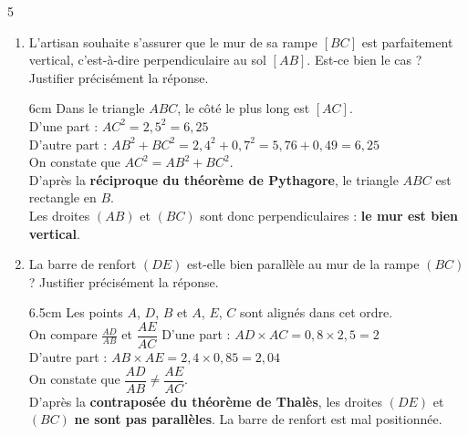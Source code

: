 \documentclass[a4paper]{book}
\begin{document}
{\begin{exerciceNote}{5}
\begin{minipage}{0.49\linewidth}
\begin{center}
            \end{center}
        \end{minipage}      
        
        \medskip
    
        \begin{enumerate}
            \item L'artisan souhaite s'assurer que le mur de sa rampe $[BC]$ est parfaitement vertical, c'est-à-dire perpendiculaire au sol $[AB]$. Est-ce bien le cas ? Justifier précisément la réponse.
            
            \begin{ZoneReponse}{6cm}
            \color{blue}
            Dans le triangle $ABC$, le côté le plus long est $[AC]$. \\
            D'une part : $AC^2 = 2{,}5^2 = 6{,}25$ \\
            D'autre part : $AB^2 + BC^2 = 2{,}4^2 + 0{,}7^2 = 5{,}76 + 0{,}49 = 6{,}25$ \\
            On constate que $AC^2 = AB^2 + BC^2$. \\
            D'après la \textbf{réciproque du théorème de Pythagore}, le triangle $ABC$ est rectangle en $B$. \\
            Les droites $(AB)$ et $(BC)$ sont donc perpendiculaires : \textbf{le mur est bien vertical}.
            \end{ZoneReponse}
            
            \item La barre de renfort $(DE)$ est-elle bien parallèle au mur de la rampe $(BC)$ ? Justifier précisément la réponse.
            
            \begin{ZoneReponse}{6.5cm}
            \color{blue}
            Les points $A$, $D$, $B$ et $A$, $E$, $C$ sont alignés dans cet ordre. \\
            On compare $\frac{AD}{AB}$ et $\dfrac{AE}{AC}$
            D'une part : ${AD}\times{AC} = 0,8\times2,5 = 2$ \\
            D'autre part : ${AB}\times {AE} = 2,4\times 0,85 = 2,04$ \\
            On constate que $\dfrac{AD}{AB} \neq \dfrac{AE}{AC}$. \\
            D'après la \textbf{contraposée du théorème de Thalès}, les droites $(DE)$ et $(BC)$ \textbf{ne sont pas parallèles}. La barre de renfort est mal positionnée.
            \end{ZoneReponse}
        \end{enumerate}
    \end{exerciceNote}
}
\end{document}
